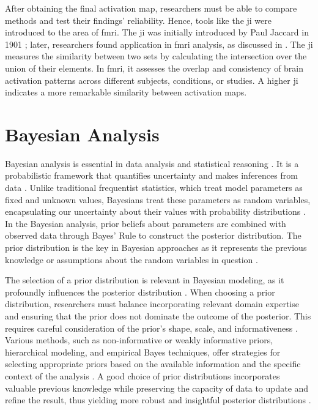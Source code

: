 After obtaining the final activation map, researchers must be able to compare methods and test their findings' reliability. Hence, tools like the \gls{ji} were introduced to the area of \gls{fmri}. The \gls{ji} was initially introduced by Paul Jaccard in 1901 \cite{jaccard1901etude}; later, researchers found application in \gls{fmri} analysis, as discussed in \cite{maitra2010re}. The \gls{ji} measures the similarity between two sets by calculating the intersection over the union of their elements. In \gls{fmri}, it assesses the overlap and consistency of brain activation patterns across different subjects, conditions, or studies. A higher \gls{ji} indicates a more remarkable similarity between activation maps.

\section{Bayesian Analysis}

Bayesian analysis is essential in data analysis and statistical reasoning \cite{bernardo1994bayesian, bolstad2016introduction}. It is a probabilistic framework that quantifies uncertainty and makes inferences from data \cite{van2021bayesian}. Unlike traditional frequentist statistics, which treat model parameters as fixed and unknown values, Bayesians treat these parameters as random variables, encapsulating our uncertainty about their values with probability distributions \cite{bayarri2004interplay}. In the Bayesian analysis, prior beliefs about parameters are combined with observed data through Bayes' Rule to construct the posterior distribution. The prior distribution is the key in Bayesian approaches as it represents the previous knowledge or assumptions about the random variables in question \cite{gelman2002prior, stone2013bayes}.

The selection of a prior distribution is relevant in Bayesian modeling, as it profoundly influences the posterior distribution \cite{kass1996formal}. When choosing a prior distribution, researchers must balance incorporating relevant domain expertise and ensuring that the prior does not dominate the outcome of the posterior. This requires careful consideration of the prior's shape, scale, and informativeness \cite{perez2002expected}. Various methods, such as non-informative or weakly informative priors, hierarchical modeling, and empirical Bayes techniques, offer strategies for selecting appropriate priors based on the available information and the specific context of the analysis \cite{terenin2017noninformative}. A good choice of prior distributions incorporates valuable previous knowledge while preserving the capacity of data to update and refine the result, thus yielding more robust and insightful posterior distributions \cite{gelman2013bayesian}.

